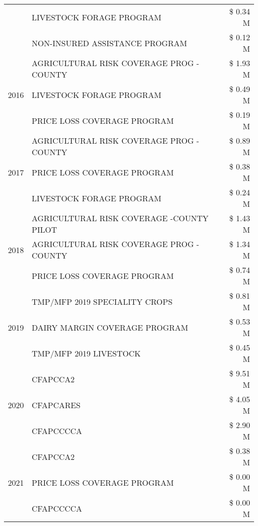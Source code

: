 \begin{tabular}{llr}
 & LIVESTOCK FORAGE PROGRAM & \$ 0.34 M \\
 & NON-INSURED ASSISTANCE PROGRAM & \$ 0.12 M \\
\cline{1-3}
\multirow[t]{3}{*}{2016} & AGRICULTURAL RISK COVERAGE PROG - COUNTY      & \$ 1.93 M \\
 & LIVESTOCK FORAGE PROGRAM                      & \$ 0.49 M \\
 & PRICE LOSS COVERAGE PROGRAM                   & \$ 0.19 M \\
\cline{1-3}
\multirow[t]{3}{*}{2017} & AGRICULTURAL RISK COVERAGE PROG - COUNTY & \$ 0.89 M \\
 & PRICE LOSS COVERAGE PROGRAM & \$ 0.38 M \\
 & LIVESTOCK FORAGE PROGRAM & \$ 0.24 M \\
\cline{1-3}
\multirow[t]{3}{*}{2018} & AGRICULTURAL RISK COVERAGE -COUNTY PILOT & \$ 1.43 M \\
 & AGRICULTURAL RISK COVERAGE PROG - COUNTY & \$ 1.34 M \\
 & PRICE LOSS COVERAGE PROGRAM & \$ 0.74 M \\
\cline{1-3}
\multirow[t]{3}{*}{2019} & TMP/MFP 2019 SPECIALITY CROPS & \$ 0.81 M \\
 & DAIRY MARGIN COVERAGE PROGRAM & \$ 0.53 M \\
 & TMP/MFP 2019 LIVESTOCK & \$ 0.45 M \\
\cline{1-3}
\multirow[t]{3}{*}{2020} & CFAPCCA2 & \$ 9.51 M \\
 & CFAPCARES & \$ 4.05 M \\
 & CFAPCCCCA & \$ 2.90 M \\
\cline{1-3}
\multirow[t]{3}{*}{2021} & CFAPCCA2 & \$ 0.38 M \\
 & PRICE LOSS COVERAGE PROGRAM & \$ 0.00 M \\
 & CFAPCCCCA & \$ 0.00 M \\
\cline{1-3}
\bottomrule
\end{tabular}
